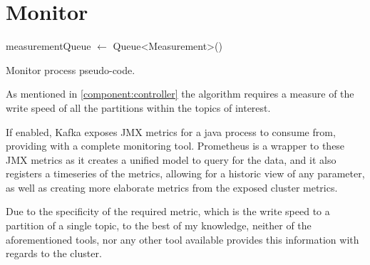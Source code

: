 \section{Monitor} \label{component:Monitor}

\IncMargin{1em} \begin{algorithm}[h]
      \BlankLine

measurementQueue $\gets$ Queue<Measurement>()\;  \caption{Monitor process pseudo-code.}
\label{algo:monitor} \end{algorithm}\DecMargin{1em}

As mentioned in \ref{component:controller} the algorithm requires a measure of
the write speed of all the partitions within the topics of interest.

If enabled, Kafka exposes JMX metrics for a java process to consume from,
providing with a complete monitoring tool. Prometheus is a wrapper to these JMX
metrics as it creates a unified model to query for the data, and it also
registers a timeseries of the metrics, allowing for a historic view of any
parameter, as well as creating more elaborate metrics from the exposed cluster
metrics.

Due to the specificity of the required metric, which is the write speed to a
partition of a single topic, to the best of my knowledge, neither of the
aforementioned tools, nor any other tool available provides this information
with regards to the cluster.

